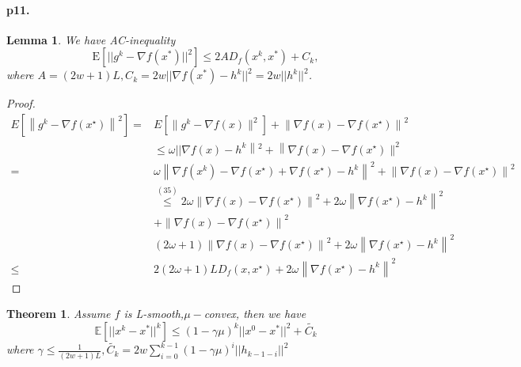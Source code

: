 \documentclass[8pt,a4paper]{article}
\newtheorem{lemma}{Lemma}
\newtheorem{theorem}{Theorem}
\newcommand{\E}{\mathbb{E}}
\begin{document}
	\paragraph{p11.}
	\begin{lemma}
	 We have AC-inequality
	\begin{equation*}
		\mathrm{E}[||g^k-\nabla f(x^*)||^2]\leq 2AD_f(x^k,x^*)+C_k,
	\end{equation*}
where $A=(2w+1)L,C_k=2w||\nabla f(x^*)-h^k||^2=2w||h^k||^2$.
	\end{lemma}
	\begin{proof}
		\begin{equation}
			\begin{aligned}
				E\left[\left\|g^k-\nabla f\left(x^{\star}\right)\right\|^{2}\right] \stackrel{}{=} & E\left[\|g^k-\nabla f(x)\|^{2}\right]+\left\|\nabla f(x)-\nabla f\left(x^{\star}\right)\right\|^{2} \\
				& \stackrel{}{\leq} \omega || \nabla f(x)-h^k\left\|^{2}+\right\| \nabla f(x)-\nabla f\left(x^{\star}\right) \|^{2} \\
				=& \omega\left\|\nabla f\left(x^{k}\right)-\nabla f\left(x^{\star}\right)+\nabla f\left(x^{\star}\right)-h^k\right\|^{2}+\left\|\nabla f(x)-\nabla f\left(x^{\star}\right)\right\|^{2} \\
				& \stackrel{(35)}{\leq} 2 \omega\left\|\nabla f(x)-\nabla f\left(x^{\star}\right)\right\|^{2}+2 \omega\left\|\nabla f\left(x^{\star}\right)-h^k\right\|^{2} \\
				&+\left\|\nabla f(x)-\nabla f\left(x^{\star}\right)\right\|^{2} \\
				&(2 \omega+1)\left\|\nabla f(x)-\nabla f\left(x^{\star}\right)\right\|^{2}+2 \omega\left\|\nabla f\left(x^{\star}\right)-h^k\right\|^{2} \\
				\leq & 2(2 \omega+1) L D_{f}\left(x, x^{\star}\right)+2 \omega\left\|\nabla f\left(x^{\star}\right)-h^k\right\|^{2}
			\end{aligned}
		\end{equation}
	\end{proof}
	\begin{theorem}
		Assume $f$ is L-smooth,$\mu-$convex, then we have
		\begin{equation*}
			\E[||x^k-x^*||^k]\leq (1-\gamma\mu)^k||x^0-x^*||^2+\tilde{C_k}
		\end{equation*}
	where $\gamma\leq\frac{1}{(2w+1)L},   \tilde{C_k}=2w\sum_{i=0}^{k-1}(1-\gamma\mu)^i||h_{k-1-i}||^2$
	\end{theorem}
\end{document}
